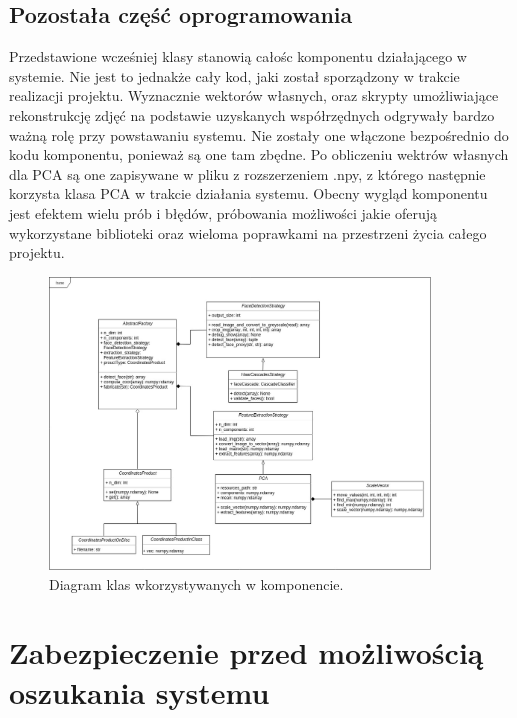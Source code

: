 \documentclass[oneside, eng]{mgr}
\begin{document}
\section{Pozostała część oprogramowania}
Przedstawione wcześniej klasy stanowią całośc komponentu działającego w systemie. Nie jest to jednakże cały kod, jaki został sporządzony w trakcie realizacji projektu. Wyznacznie wektorów własnych, oraz skrypty umożliwiające rekonstrukcję zdjęć na podstawie uzyskanych współrzędnych odgrywały bardzo ważną rolę przy powstawaniu systemu. Nie zostały one włączone bezpośrednio do kodu komponentu, ponieważ są one tam zbędne. Po obliczeniu wektrów własnych dla PCA są one zapisywane w pliku z rozszerzeniem .npy, z którego następnie korzysta klasa PCA w trakcie działania systemu. Obecny wygląd komponentu jest efektem wielu prób i błędów, próbowania możliwości jakie oferują wykorzystane biblioteki oraz wieloma poprawkami na przestrzeni życia całego projektu.

\begin{figure}
\centering
	\includegraphics[width=0.90\textwidth]{Diagram.jpg}\par\vspace{1cm}
\caption{Diagram klas wkorzystywanych w komponencie.}
	\label{fig:diagram_klas}
\end{figure}


\newpage

\chapter{Zabezpieczenie przed możliwością oszukania systemu}
\end{document}
